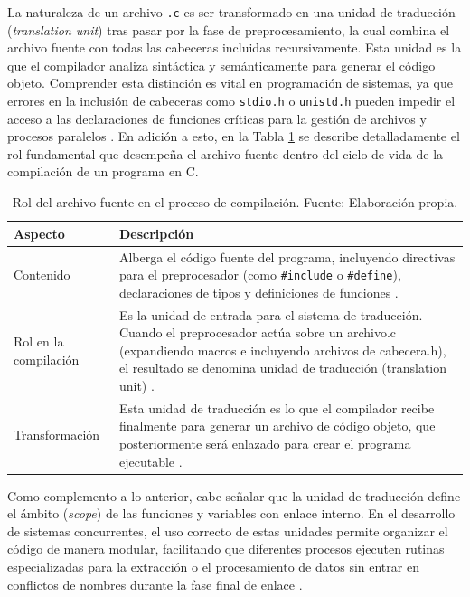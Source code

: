 La naturaleza de un archivo \texttt{.c} es ser transformado en una unidad de traducción (\textit{translation unit}) tras pasar por la fase de preprocesamiento, la cual combina el archivo fuente con todas las cabeceras incluidas recursivamente. Esta unidad es la que el compilador analiza sintáctica y semánticamente para generar el código objeto. Comprender esta distinción es vital en programación de sistemas, ya que errores en la inclusión de cabeceras como \texttt{stdio.h} o \texttt{unistd.h} pueden impedir el acceso a las declaraciones de funciones críticas para la gestión de archivos y procesos paralelos \cite{wiki_translation_unit, glibc_manual, wiki_translation_unit}. En adición a esto, en la Tabla \ref{tab:archivo_fuente_compilacion} se describe detalladamente el rol fundamental que desempeña el archivo fuente dentro del ciclo de vida de la compilación de un programa en C.

\begin{table}[H]
\centering
\begin{tabular}{|p{3cm}|p{10cm}|}
\hline
\textbf{Aspecto} & \textbf{Descripción} \\
\hline
Contenido & Alberga el código fuente del programa, incluyendo directivas para el preprocesador (como \texttt{\#include} o \texttt{\#define}), declaraciones de tipos y definiciones de funciones \cite{iso2024c}. \\
\hline
Rol en la compilación & Es la unidad de entrada para el sistema de traducción. Cuando el preprocesador actúa sobre un archivo.c (expandiendo macros e incluyendo archivos de cabecera.h), el resultado se denomina unidad de traducción (translation unit) \cite{wiki_translation_unit, glibc_manual}. \\
\hline
Transformación & Esta unidad de traducción es lo que el compilador recibe finalmente para generar un archivo de código objeto, que posteriormente será enlazado para crear el programa ejecutable \cite{wiki_translation_unit}. \\
\hline
\end{tabular}
\caption{Rol del archivo fuente en el proceso de compilación. Fuente: Elaboración propia.}
\label{tab:archivo_fuente_compilacion}
\end{table}

Como complemento a lo anterior, cabe señalar que la unidad de traducción define el ámbito (\textit{scope}) de las funciones y variables con enlace interno. En el desarrollo de sistemas concurrentes, el uso correcto de estas unidades permite organizar el código de manera modular, facilitando que diferentes procesos ejecuten rutinas especializadas para la extracción o el procesamiento de datos sin entrar en conflictos de nombres durante la fase final de enlace \cite{wiki_translation_unit}.

